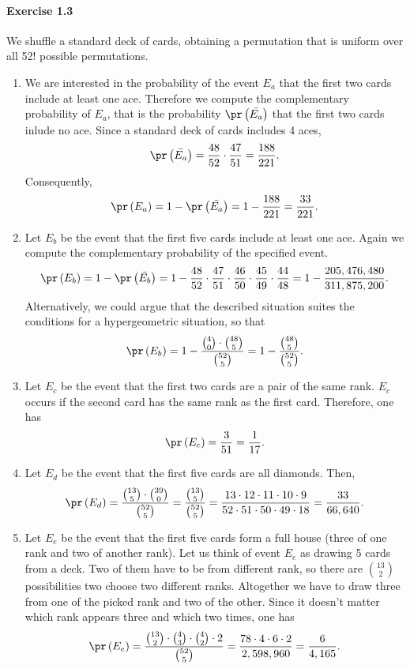 \paragraph{Exercise 1.3} We shuffle a standard deck of cards, obtaining a permutation
that is uniform over all 52! possible permutations.
\begin{enumerate}
  \item[(a)] We are interested in the probability of the event $E_a$ that the
    first two cards include at least one ace. Therefore we compute the complementary
    probability of $E_a$, that is the probability $\pr\left(\bar{E_a}\right)$
    that the first two cards inlude no ace. Since a standard deck of cards
    includes 4 aces,
    \[ \pr\left(\bar{E_a}\right) = \frac{48}{52} \cdot \frac{47}{51} = \frac{188}{221}.\]
    Consequently,
    \[ \pr\left(E_a\right) = 1 - \pr\left(\bar{E_a}\right) = 1 - \frac{188}{221} = \frac{33}{221}.\]

  \item[(b)] Let $E_b$ be the event that the first five cards include at least one
    ace. Again we compute the complementary probability of the specified event.
    \[
      \pr\left(E_b\right)
        = 1 - \pr\left(\bar{E_b}\right)
        = 1 - \frac{48}{52} \cdot \frac{47}{51} \cdot \frac{46}{50} \cdot \frac{45}{49} \cdot \frac{44}{48}
        = 1 - \frac{205,476,480}{311,875,200}.
    \]
    Alternatively, we could argue that the described situation suites the conditions
    for a hypergeometric situation, so that
    \[
      \pr\left(E_b\right)
        = 1 - \frac{\binom{4}{0} \cdot \binom{48}{5}}{\binom{52}{5}}
        = 1 - \frac{\binom{48}{5}}{\binom{52}{5}}.
    \]

  \item[(c)] Let $E_c$ be the event that the first two cards are a pair of the
    same rank.  $E_c$ occurs if the second card has the same rank as the first
    card. Therefore, one has
    \[ \pr\left(E_c\right) = \frac{3}{51} = \frac{1}{17}.\]

  \item[(d)] Let $E_d$ be the event that the first five cards are all diamonds. Then,
    \[
      \pr\left(E_d\right)
        = \frac{\binom{13}{5} \cdot \binom{39}{0}}{\binom{52}{5}}
        = \frac{\binom{13}{5}}{\binom{52}{5}}
        = \frac{13 \cdot 12 \cdot 11 \cdot 10 \cdot 9}{52 \cdot 51 \cdot 50 \cdot 49 \cdot 18}
        = \frac{33}{66,640}.
    \]

  \item[(e)] Let $E_e$ be the event that the first five cards form a full house
    (three of one rank and two of another rank). Let us think of event $E_e$ as
    drawing 5 cards from a deck. Two of them have to be from different rank, so
    there are $\binom{13}{2}$ possibilities two choose two different ranks.
    Altogether we have to draw three from one of the picked rank and two of the
    other. Since it doesn't matter which rank appears three and which two times,
    one has
    \[
      \pr\left(E_e\right)
        = \frac{\binom{13}{2} \cdot \binom{4}{3} \cdot \binom{4}{2} \cdot 2}{\binom{52}{5}}
        = \frac{78 \cdot 4 \cdot 6 \cdot 2}{2,598,960}
        = \frac{6}{4,165}.
    \]
\end{enumerate}

